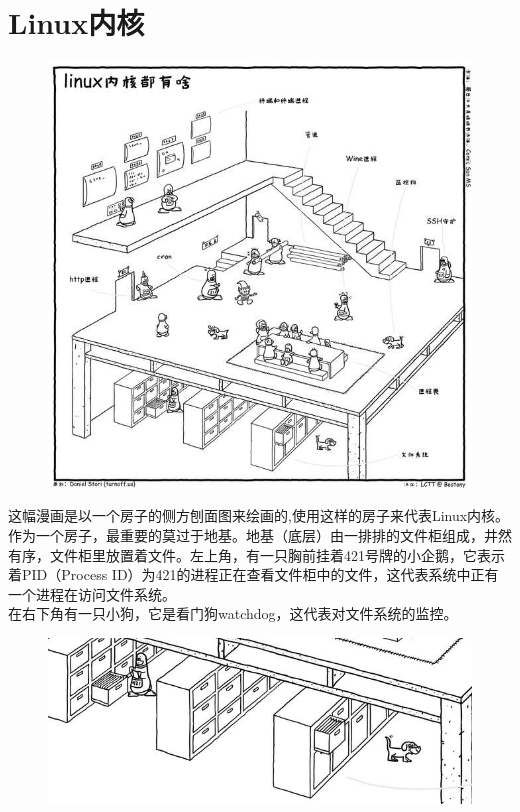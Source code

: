 \documentclass[12pt, openany, oneside]{book}
\begin{document}
\newpage

\section{Linux内核}

\begin{figure}[H]
    \centering
    \includegraphics[scale=0.8]{img/C1/1-2/1.png}
\end{figure}

这幅漫画是以一个房子的侧方刨面图来绘画的,使用这样的房子来代表Linux内核。 \\

作为一个房子，最重要的莫过于地基。地基（底层）由一排排的文件柜组成，井然有序，文件柜里放置着文件。左上角，有一只胸前挂着421号牌的小企鹅，它表示着PID（Process ID）为421的进程正在查看文件柜中的文件，这代表系统中正有一个进程在访问文件系统。 \\

在右下角有一只小狗，它是看门狗watchdog，这代表对文件系统的监控。 \\

\begin{figure}[H]
    \centering
    \includegraphics[scale=0.8]{img/C1/1-2/2.png}
\end{figure}
\end{document}

